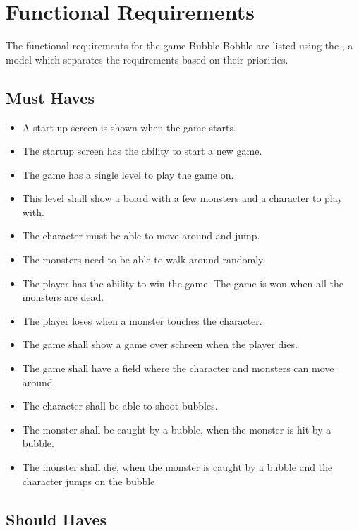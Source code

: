 \chapter{Functional Requirements}

The functional requirements for the game Bubble Bobble are listed using the , a model which separates the requirements based on their priorities.

\section{Must Haves}

\begin{itemize}
\itemsep0em 
 	\item A start up screen is shown when the game starts.
  	\item The startup screen has the ability to start a new game.
  	\item The game has a single level to play the game on.
  	\item This level shall show a board with a few monsters and a character to play with.
  	\item The character must be able to move around and jump.
  	\item The monsters need to be able to walk around randomly.
 	\item The player has the ability to win the game.
 	\itme The game is won when all the monsters are dead.
 	\item The player loses when a monster touches the character.
 	\item The game shall show a game over schreen when the player dies.
 	\item The game shall have a field where the character and monsters can move around.
 	\item The character shall be able to shoot bubbles.
 	\item The monster shall be caught by a bubble, when the monster is hit by a bubble.
 	\item The monster shall die, when the monster is caught by a bubble and the character jumps on the bubble
\end{itemize}

\section{Should Haves}

